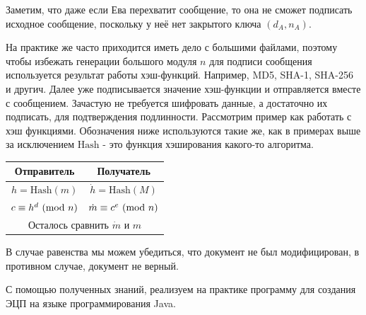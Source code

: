 Заметим, что даже если Ева перехватит сообщение, то она не сможет подписать исходное сообщение, поскольку у неё нет закрытого ключа $(d_A, n_A)$.

На практике же часто приходится иметь дело с большими файлами, поэтому чтобы избежать генерации большого модуля $n$ для подписи сообщения используется результат работы хэш-функций.
Например, MD5, SHA-1, SHA-256 и другич. Далее уже подписывается значение хэш-функции и отправляется вместе с сообщением.
Зачастую не требуется шифровать данные, а достаточно их подписать, для подтверждения подлинности. Рассмотрим пример как работать с хэш функциями. Обозначения ниже используются такие же, как в примерах выше за исключением $\mathrm{Hash}$ - это функция хэширования какого-то алгоритма.
\begin{table}[h!]
\centering
\begin{tabular}{c | c}
Отправитель & Получатель \\
\hline
$h = \mathrm{Hash}(m)$ & $\dot{h} = \mathrm{Hash}(M)$\\
$c \equiv h^d \ (\mathrm{mod}\ n)$ & $\dot{m} \equiv c^e \ (\mathrm{mod}\ n)$\\
\multicolumn{2}{c}{Осталось сравнить $\dot{m}$ и $m$}
\end{tabular}
\end{table}

В случае равенства мы можем убедиться, что документ не был модифицирован, в противном случае, документ не верный.

С помощью полученных знаний, реализуем на практике программу для создания ЭЦП на языке программирования Java.